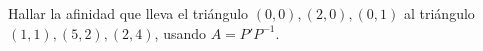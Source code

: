 \begin{ejercicio}
Hallar la afinidad que lleva el triángulo \((0,0),(2,0),(0,1)\) al triángulo
\((1,1),(5,2),(2,4)\), usando \(A=P'P^{-1}\).
\end{ejercicio}
